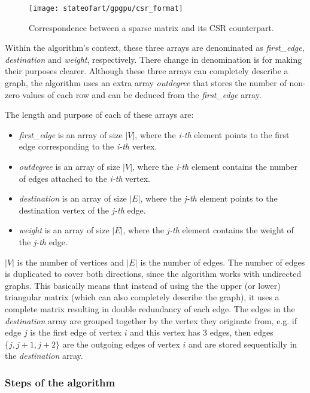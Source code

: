 \begin{figure}[hbtp]
\centering
\texttt{[image: stateofart/gpgpu/csr\_format]}
\caption{Correspondence between a sparse matrix and its CSR counterpart.}
\label{fig:csr}
\end{figure}

Within the algorithm's context, these three arrays are denominated as \emph{first\_edge}, \emph{destination} and \emph{weight}, respectively.
There change in denomination is for making their purposes clearer.
Although these three arrays can completely describe a graph, the algorithm uses an extra array \emph{outdegree} that stores the number of non-zero values of each row and can be deduced from the \emph{first\_edge} array.

The length and purpose of each of these arrays are:
\begin{itemize}
	\item \emph{first\_edge} is an array of size $|V|$, where the \emph{i-th} element points to the first edge corresponding to the \emph{i-th} vertex.
	\item \emph{outdegree} is an array of size $|V|$, where the \emph{i-th} element contains the number of edges attached to the \emph{i-th} vertex.
	\item \emph{destination} is an array of size $|E|$, where the \emph{j-th} element points to the destination vertex of the \emph{j-th} edge.
	\item \emph{weight} is an array of size $|E|$, where the \emph{j-th} element contains the weight of the \emph{j-th} edge.
\end{itemize}

$|V|$ is the number of vertices and $|E|$ is the number of edges.
The number of edges is duplicated to cover both directions, since the algorithm works with undirected graphs.
This basically means that instead of using the the upper (or lower) triangular matrix (which can also completely describe the graph), it uses a complete matrix resulting in double redundancy of each edge.
The edges in the \emph{destination} array are grouped together by the vertex they originate from, e.g. if edge $j$ is the first edge of vertex $i$ and this vertex has 3 edges, then edges $\{j,j+1,j+2\}$ are the outgoing edges of vertex $i$ and are stored sequentially in the \emph{destination} array.

\subsubsection{Steps of the algorithm}

